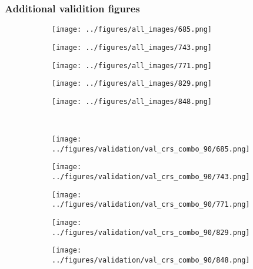 \subsubsection{Additional validition figures}
\begin{figure}[h!]
	\begin{subfigure}{0.19\textwidth}
		\centering
		\texttt{[image: ../figures/all\_images/685.png]}
		\label{fig:1}
	\end{subfigure}
	\begin{subfigure}{0.19\textwidth}
		\centering
		\texttt{[image: ../figures/all\_images/743.png]}
		\label{fig:1}
	\end{subfigure}
	\begin{subfigure}{0.19\textwidth}
		\centering
		\texttt{[image: ../figures/all\_images/771.png]}
		\label{fig:1}
	\end{subfigure}
	\begin{subfigure}{0.19\textwidth}
		\centering
		\texttt{[image: ../figures/all\_images/829.png]}
		\label{fig:1}
	\end{subfigure}
	\begin{subfigure}{0.19\textwidth}
		\centering
		\texttt{[image: ../figures/all\_images/848.png]}
		\label{fig:1}
	\end{subfigure}
	\vspace{-0.35cm}
	\\
	\begin{subfigure}{0.19\textwidth}
		\centering
		\texttt{[image: ../figures/validation/val\_crs\_combo\_90/685.png]}
		\label{fig:1}
	\end{subfigure}
	\begin{subfigure}{0.19\textwidth}
		\centering
		\texttt{[image: ../figures/validation/val\_crs\_combo\_90/743.png]}
		\label{fig:1}
	\end{subfigure}
	\begin{subfigure}{0.19\textwidth}
		\centering
		\texttt{[image: ../figures/validation/val\_crs\_combo\_90/771.png]}
		\label{fig:1}
	\end{subfigure}
	\begin{subfigure}{0.19\textwidth}
		\centering
		\texttt{[image: ../figures/validation/val\_crs\_combo\_90/829.png]}
		\label{fig:1}
	\end{subfigure}
	\begin{subfigure}{0.19\textwidth}
		\centering
		\texttt{[image: ../figures/validation/val\_crs\_combo\_90/848.png]}

\end{subfigure}
\end{figure}
